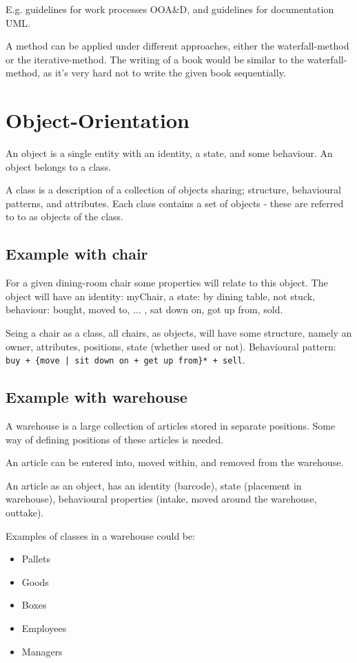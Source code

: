 E.g. guidelines for work processes OOA\&D, and guidelines for documentation UML.

A method can be applied under different approaches, either the waterfall-method or the iterative-method. The writing of a book would be similar to the waterfall-method, as it's very hard not to write the given book sequentially.

\section{Object-Orientation}
An object is a single entity with an identity, a state, and some behaviour. An object belongs to a class.

A class is a description of a collection of objects sharing; structure, behavioural patterns, and attributes. Each class contains a set of objects - these are referred to to as objects of the class.

\subsection{Example with chair}
For a given dining-room chair some properties will relate to this object. The object will have an identity: myChair, a state: by dining table, not stuck, behaviour: bought, moved to, ... , sat down on, got up from, sold.

Seing a chair as a class, all chairs, as objects, will have some structure, namely an owner, attributes, positions, state (whether used or not). Behavioural pattern: \texttt{buy + \{move | sit down on + get up from\}* + sell}.

\subsection{Example with warehouse}
A warehouse is a large collection of articles stored in separate positions. Some way of defining positions of these articles is needed.

An article can be entered into, moved within, and removed from the warehouse. 

An article as an object, has an identity (barcode), state (placement in warehouse), behavioural properties (intake, moved around the warehouse, outtake).

Examples of classes in a warehouse could be:
\begin{itemize}
    \item Pallets
    \item Goods
    \item Boxes
    \item Employees
    \item Managers
\end{itemize}

